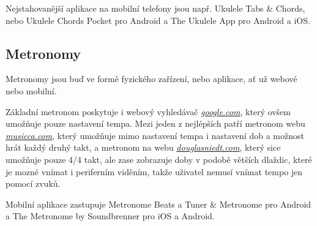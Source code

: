 Nejstahovanější aplikace na mobilní telefony jsou např. Ukulele Tabs \& Chords, nebo Ukulele Chords Pocket pro Android a The Ukulele App pro Android a iOS.

\subsection{Metronomy}
\label{ss:metronomes}
Metronomy jsou buď ve formě fyzického zařízení, nebo aplikace, ať už webové nebo mobilní.

Základní metronom poskytuje i webový vyhledávač \href{www.google.com}{\emph{google.com}}, který ovšem umožňuje pouze nastavení tempa. Mezi jeden z nejlépších patří metronom webu \href{www.musicca.com}{\emph{musicca.com}}, který umožňuje mimo nastavení tempa i nastavení dob a možnost hrát každý druhý takt, a metronom na webu \href{www.douglasniedt.com}{\emph{douglasniedt.com}}, který sice umožňuje pouze 4/4 takt, ale zase zobrazuje doby v podobě větších dlaždic, které je mozné vnímat i periferním viděním, takže uživatel nemusí vnímat tempo jen pomocí zvuků.

Mobilní aplikace zastupuje Metronome Beats a Tuner \& Metronome pro Android a The Metronome by Soundbrenner pro iOS a Android.
